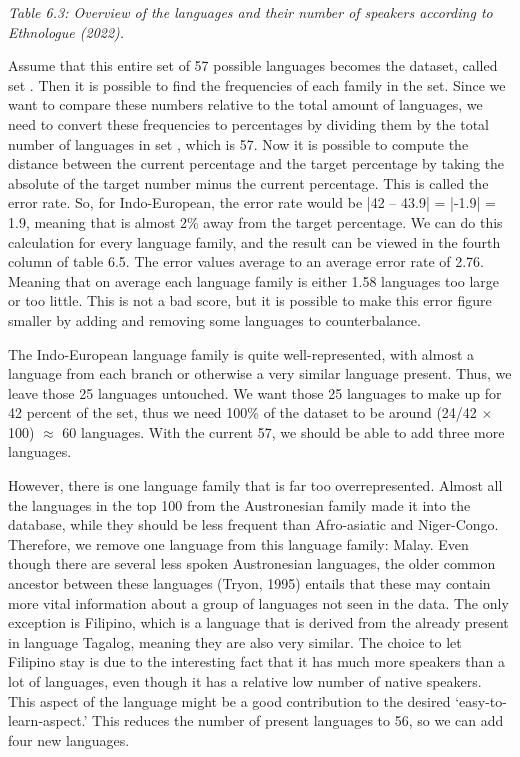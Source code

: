 \vspace{0.1cm}
{\it \footnotesize Table 6.3: Overview of the languages and their number of speakers according to Ethnologue (2022).}
\vspace{0.3cm}


\noindent Assume that this entire set of 57 possible languages becomes the dataset, called set \alpha. Then it is possible to find the frequencies of each family in the \alpha set. Since we want to compare these numbers relative to the total amount of languages, we need to convert these frequencies to percentages by dividing them by the total number of languages in set \alpha, which is 57. Now it is possible to compute the distance between the current percentage and the target percentage by taking the absolute of the target number minus the current percentage. This is called the error rate. So, for Indo-European, the error rate would be |42 – 43.9| = |-1.9| = 1.9, meaning that is almost 2\% away from the target percentage. We can do this calculation for every language family, and the result can be viewed in the fourth column of table 6.5. The error values average to an average error rate of 2.76. Meaning that on average each language family is either 1.58 languages too large or too little. This is not a bad score, but it is possible to make this error figure smaller by adding and removing some languages to counterbalance. 

The Indo-European language family is quite well-represented, with almost a language from each branch or otherwise a very similar language present. Thus, we leave those 25 languages untouched. We want those 25 languages to make up for 42 percent of the set, thus we need 100\% of the dataset to be around (24/42 $\times$ 100) $\approx$ 60 languages. With the current 57, we should be able to add three more languages. 

However, there is one language family that is far too overrepresented. Almost all the languages in the top 100 from the Austronesian family made it into the  database, while they should be less frequent than Afro-asiatic and Niger-Congo. Therefore, we remove one language from this language family: Malay. Even though there are several less spoken Austronesian languages, the older common ancestor between these languages (Tryon, 1995) entails that these may contain more vital information about a group of languages not seen in the data. The only exception is Filipino, which is a language that is derived from the already present in  language Tagalog, meaning they are also very similar. The choice to let Filipino stay is due to the interesting fact that it has much more speakers than a lot of languages, even though it has a relative low number of native speakers. This aspect of the language might be a good contribution to the desired ‘easy-to-learn-aspect.’ This reduces the number of present languages to 56, so we can add four new languages. 

